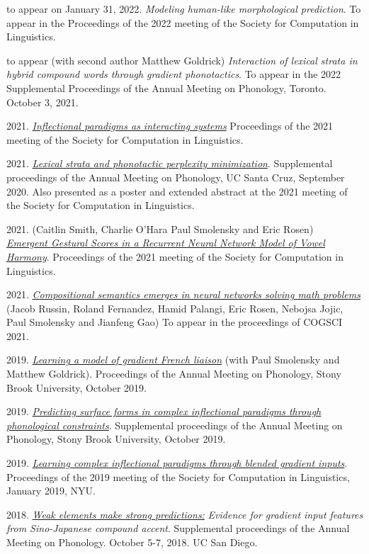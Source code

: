 \documentclass[11pt]{article}
\newcommand{\itt}[1]{\textit{#1}}
\newcommand{\ii}{\item}
\begin{document}
\begin{enumerate}[label={[\arabic*]}]
\ii to appear on January 31, 2022.  \textit{Modeling human-like morphological prediction}.  To appear in the Proceedings of the 2022 meeting of the Society for Computation in Linguistics.
\ii to appear (with second author Matthew Goldrick) \textit{Interaction of lexical strata in hybrid compound words through gradient phonotactics}. To appear in the 2022 Supplemental Proceedings of the Annual Meeting on Phonology, Toronto. October 3, 2021.
\ii 2021. \href{https://scholarworks.umass.edu/scil/vol4/iss1/14/}{\itt{Inflectional paradigms as interacting systems}} Proceedings of the 2021 meeting of the Society for Computation in Linguistics.
\ii 2021. \href{https://scholarworks.umass.edu/scil/vol4/iss1/49/}{\itt{Lexical strata and phonotactic perplexity minimization}}. Supplemental proceedings of the Annual Meeting on Phonology, UC Santa Cruz, September 2020. Also presented as a poster and extended abstract at the 2021 meeting of the Society for Computation in Linguistics.
\ii 2021. (Caitlin Smith, Charlie O'Hara Paul Smolensky and Eric Rosen) \\\href{https://caitlinsmith14.github.io/pdf/smithetal_scil2021_paper.pdf}{\itt{Emergent Gestural Scores in a Recurrent Neural Network Model of Vowel Harmony}}. Proceedings of the 2021 meeting of the Society for Computation in Linguistics.
\ii 2021. \href{https://en.x-mol.com/paper/article/1395477939799703552}{\itt{Compositional semantics emerges in neural networks solving math problems}} (Jacob Russin, Roland Fernandez, Hamid Palangi, Eric Rosen, Nebojsa Jojic, Paul Smolensky and Jianfeng Gao) To appear in the proceedings of COGSCI 2021.
\ii 2019. \href{https://journals.linguisticsociety.org/proceedings/index.php/amphonology/article/view/4680}{\itt{Learning a model of gradient French liaison}} (with Paul Smolensky and Matthew Goldrick). Proceedings of the Annual Meeting on Phonology, Stony Brook University, October 2019.
\ii  2019. \href{https://journals.linguisticsociety.org/proceedings/index.php/amphonology/article/view/4683}{\itt{Predicting surface forms in complex inflectional paradigms through phonological constraints}}. Supplemental proceedings of the Annual Meeting on Phonology, Stony Brook University, October 2019.
\ii 2019. \href{https://scholarworks.umass.edu/scil/vol2/iss1/12/}{\itt{Learning complex inflectional paradigms through blended gradient inputs}}. Proceedings of the 2019 meeting of the Society for Computation in Linguistics, January 2019, NYU. 
\ii 2018. \href{https://journals.linguisticsociety.org/proceedings/index.php/amphonology/article/view/4571}{\itt{Weak elements make strong predictions:}} \itt{Evidence for gradient input features from Sino-Japanese compound accent}. Supplemental proceedings of the Annual Meeting on Phonology. October 5-7, 2018. UC San Diego.

\end{enumerate}
\end{document}
